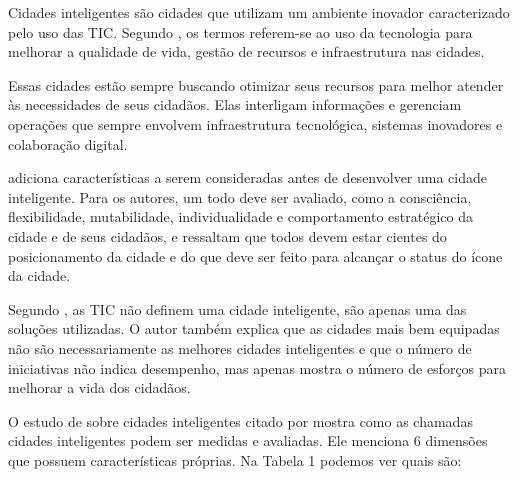 Cidades inteligentes são cidades que utilizam um ambiente inovador caracterizado pelo uso das TIC. Segundo , os termos referem-se ao uso da tecnologia para melhorar a qualidade de vida, gestão de recursos e infraestrutura nas cidades.

Essas cidades estão sempre buscando otimizar seus recursos para melhor atender às necessidades de seus cidadãos. Elas interligam informações e gerenciam operações que sempre envolvem infraestrutura tecnológica, sistemas inovadores e colaboração digital.

 adiciona características a serem consideradas antes de desenvolver uma cidade inteligente. Para os autores, um todo deve ser avaliado, como a consciência, flexibilidade, mutabilidade, individualidade e comportamento estratégico da cidade e de seus cidadãos, e ressaltam que todos devem estar cientes do posicionamento da cidade e do que deve ser feito para alcançar o status do ícone da cidade.

Segundo , as TIC não definem uma cidade inteligente, são apenas uma das soluções utilizadas. O autor também explica que as cidades mais bem equipadas não são necessariamente as melhores cidades inteligentes e que o número de iniciativas não indica desempenho, mas apenas mostra o número de esforços para melhorar a vida dos cidadãos.

O estudo de  sobre cidades inteligentes citado por  mostra como as chamadas cidades inteligentes podem ser medidas e avaliadas. Ele menciona 6 dimensões que possuem características próprias. Na Tabela 1 podemos ver quais são:

